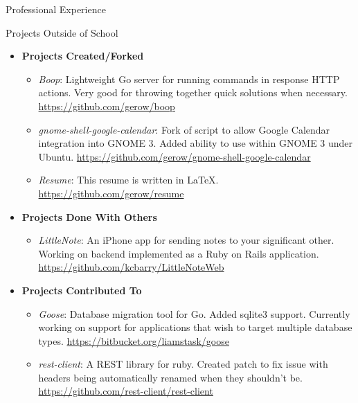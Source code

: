 \documentclass[8pt,oneside]{article}
\newenvironment{ressection}[1]{
	\vspace{4pt}
	{\fontfamily{phv}\selectfont\large#1}
	\begin{itemize}
	\vspace{3pt}
}{
	\end{itemize}
}
\newcommand{\ressubitem}[1]{
	\vspace{-1pt}
	\item \begin{flushleft} #1 \end{flushleft}
}
\newcommand{\resbigitem}[3]{
	\vspace{-5pt}
	\item
	\textbf{#1}---#2 \\
	\textit{#3}
}
\newcommand{\resveryshortbigitem}[1]{
	\vspace{-5pt}
	\item
	\textbf{#1}
}
\newenvironment{ressubsec}[3]{
	\resbigitem{#1}{#2}{#3}
	\vspace{-2pt}
	\begin{itemize}
}{
	\end{itemize}
}
\newenvironment{resveryshortsubsec}[1]{
	\resveryshortbigitem{#1}
	\vspace{-2pt}
	\begin{itemize}
}{
    \end{itemize}
}
\begin{document}
\begin{ressection}{Professional Experience}
	\begin{comment}
	\begin{ressubsec}{Tulsa Day Center For the Homeless}{Tulsa, OK}{Volunteer:  July 2006--September 2009}
		\ressubitem{Worked mainly with individuals receiving tuberculosis tests.}
		\ressubitem{Entered tuberculosis data and kept computerized records between the Day Center for the Homeless and the Tulsa City-County Health Department up to date.}
	\end{ressubsec}
	\end{comment}

\end{ressection}

\pagebreak

\begin{ressection}{Projects Outside of School}
    \begin{resveryshortsubsec}{Projects Created/Forked}
        \ressubitem{\emph{Boop}: Lightweight Go server for running commands in response HTTP actions.  Very good for throwing together quick solutions when necessary. \url{https://github.com/gerow/boop}}
        \ressubitem{\emph{gnome-shell-google-calendar}: Fork of script to allow Google Calendar integration into GNOME 3. Added ability to use within GNOME 3 under Ubuntu. \url{https://github.com/gerow/gnome-shell-google-calendar}}
        \ressubitem{\emph{Resume}: This resume is written in \LaTeX. \url{https://github.com/gerow/resume}}
    \end{resveryshortsubsec}
    \begin{resveryshortsubsec}{Projects Done With Others}
        \ressubitem{\emph{LittleNote}: An iPhone app for sending notes to your significant other.  Working on backend implemented as a Ruby on Rails application. \url{https://github.com/kcbarry/LittleNoteWeb}}
    \end{resveryshortsubsec}
    \begin{resveryshortsubsec}{Projects Contributed To}
        \ressubitem{\emph{Goose}: Database migration tool for Go. Added sqlite3 support. Currently working on support for applications that wish to target multiple database types. \url{https://bitbucket.org/liamstask/goose}}
        \ressubitem{\emph{rest-client}: A REST library for ruby.  Created patch to fix issue with headers being automatically renamed when they shouldn't be. \url{https://github.com/rest-client/rest-client}}
    \end{resveryshortsubsec}
\end{ressection}
\end{document}
